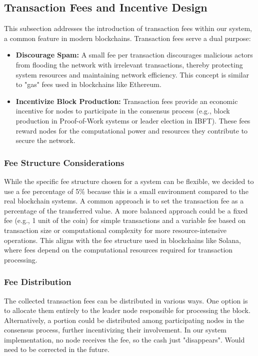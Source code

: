 \subsection{Transaction Fees and Incentive Design}

This subsection addresses the introduction of transaction fees within our system, a common feature in modern blockchains. Transaction fees serve a dual purpose:

\begin{itemize}
    \item \textbf{Discourage Spam:} A small fee per transaction discourages malicious actors from flooding the network with irrelevant transactions, thereby protecting system resources and maintaining network efficiency. This concept is similar to "gas" fees used in blockchains like Ethereum.
    \item \textbf{Incentivize Block Production:} Transaction fees provide an economic incentive for nodes to participate in the consensus process (e.g., block production in Proof-of-Work systems or leader election in IBFT). These fees reward nodes for the computational power and resources they contribute to secure the network.
\end{itemize}

\subsubsection*{Fee Structure Considerations} While the specific fee structure chosen for a system can be flexible, we decided to use a fee percentage of 5\% because this is a small environment compared to the real blockchain systems. A common approach is to set the transaction fee as a percentage of the transferred value. A more balanced approach could be a fixed fee (e.g., 1 unit of the coin) for simple transactions and a variable fee based on transaction size or computational complexity for more resource-intensive operations. This aligns with the fee structure used in blockchains like Solana, where fees depend on the computational resources required for transaction processing.

\subsubsection*{Fee Distribution} The collected transaction fees can be distributed in various ways. One option is to allocate them entirely to the leader node responsible for processing the block. Alternatively, a portion could be distributed among participating nodes in the consensus process, further incentivizing their involvement. In our system implementation, no node receives the fee, so the cash just "disappears". Would need to be corrected in the future.

